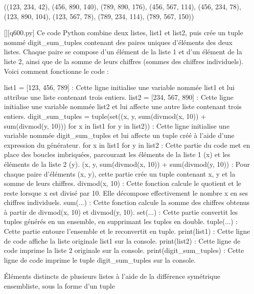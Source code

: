 ((123, 234, 42), (456, 890, 140), (789, 890, 176), (456, 567, 114), (456, 234, 78), (123, 890, 104), (123, 567, 78), (789, 234, 114), (789, 567, 150))
        \par
        \begin{solution}
            \renewcommand{\nomfichier}{q600.py}
            \pythonfile{\chemincode \nomfichier}[][\nomfichier]
            Ce code Python combine deux listes, list1 et list2, puis crée un tuple nommé digit_sum_tuples contenant des paires uniques d'éléments des deux listes. Chaque paire se compose d'un élément de la liste 1 et d'un élément de la liste 2, ainsi que de la somme de leurs chiffres (sommes des chiffres individuels). Voici comment fonctionne le code :

    list1 = [123, 456, 789] : Cette ligne initialise une variable nommée list1 et lui attribue une liste contenant trois entiers.
    list2 = [234, 567, 890] : Cette ligne initialise une variable nommée list2 et lui affecte une autre liste contenant trois entiers.
    digit_sum_tuples = tuple(set((x, y, sum(divmod(x, 10)) + sum(divmod(y, 10))) for x in list1 for y in list2)) : Cette ligne initialise une variable nommée digit_sum_tuples et lui affecte un tuple créé à l'aide d'une expression du générateur.
        for x in list1 for y in list2 : Cette partie du code met en place des boucles imbriquées, parcourant les éléments de la liste 1 (x) et les éléments de la liste 2 (y).
        (x, y, sum(divmod(x, 10)) + sum(divmod(y, 10)) : Pour chaque paire d'éléments (x, y), cette partie crée un tuple contenant x, y et la somme de leurs chiffres.
            divmod(x, 10) : Cette fonction calcule le quotient et le reste lorsque x est divisé par 10. Elle décompose effectivement le nombre x en ses chiffres individuels.
            sum(...) : Cette fonction calcule la somme des chiffres obtenus à partir de divmod(x, 10) et divmod(y, 10).
        set(...) : Cette partie convertit les tuples générés en un ensemble, en supprimant les tuples en double.
        tuple(...) : Cette partie entoure l'ensemble et le reconvertit en tuple.
    print(list1) : Cette ligne de code affiche la liste originale list1 sur la console.
    print(list2) : Cette ligne de code imprime la liste 2 originale sur la console.
    print(digit_sum_tuples) : Cette ligne de code imprime le tuple digit_sum_tuples sur la console.
        \end{solution}
        

        \question
        Éléments distincts de plusieurs listes à l'aide de la différence symétrique ensembliste, sous la forme d'un tuple

